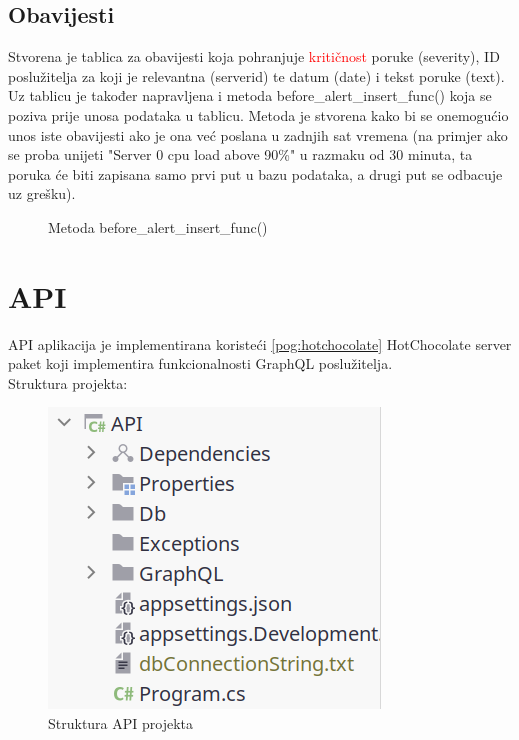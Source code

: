 \documentclass[zavrsnirad]{fer}
\begin{document}
\section{Obavijesti}
Stvorena je tablica za obavijesti koja pohranjuje \textcolor{red}{kritičnost} poruke (severity), ID poslužitelja za koji je relevantna (serverid) te datum (date) i tekst poruke (text).
\\Uz tablicu je također napravljena i metoda before\_alert\_insert\_func() koja se poziva prije unosa podataka u tablicu. Metoda je stvorena kako bi se onemogućio unos iste obavijesti ako je ona već poslana u zadnjih sat vremena (na primjer ako se proba unijeti "Server 0 cpu load above 90\%" u razmaku od 30 minuta, ta poruka će biti zapisana samo prvi put u bazu podataka, a drugi put se odbacuje uz grešku).

\begin{figure}[htb]
	\centering
	
	\caption{Metoda before\_alert\_insert\_func()}
\end{figure}
\FloatBarrier

\chapter{API}
API aplikacija je implementirana koristeći \ref{pog:hotchocolate} HotChocolate server paket koji implementira funkcionalnosti GraphQL poslužitelja.
\\Struktura projekta:
\begin{figure}[htb]
	\centering
	\includegraphics[width=0.4\linewidth]{images/api_structure.png} 
	\caption{Struktura API projekta}
	\label{slk:api_structure}
\end{figure}
\FloatBarrier
\end{document}
